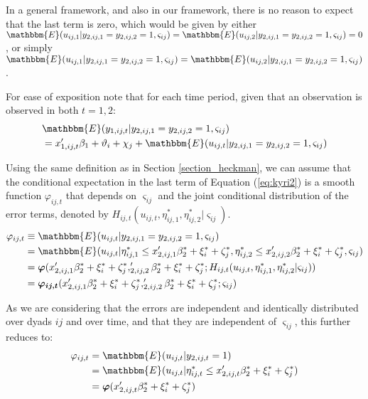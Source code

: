In a general framework, and also in our framework, there is no reason to expect that the last term is zero, which would be given by either $\mathbbm{E} (u_{ij,1} \rvert y_{2,ij,1} = y_{2,ij,2} = 1, \varsigma_{ij}) = \mathbbm{E} (u_{ij,2} \rvert y_{2,ij,1} = y_{2,ij,2} = 1, \varsigma_{ij}) = 0$, or simply  $\mathbbm{E} (u_{ij,1} \rvert y_{2,ij,1} = y_{2,ij,2} = 1, \varsigma_{ij}) = \mathbbm{E} (u_{ij,2} \rvert y_{2,ij,1} = y_{2,ij,2} = 1, \varsigma_{ij})$.

For ease of exposition note that for each time period, given that an observation is observed in both $t=1,2$:
\begin{align} \label{eq:kyri2}
    &\mathbbm{E}(y_{1,ij,t} \rvert y_{2,ij,1} = y_{2,ij,2} = 1, \varsigma_{ij}) \\
    &= x_{1,ij,t}'\beta_1 + \vartheta_i + \chi_j + \mathbbm{E} (u_{ij,t} \rvert y_{2,ij,1} = y_{2,ij,2} = 1, \varsigma_{ij}) \nonumber
\end{align}

Using the same definition as in Section \ref{section_heckman}, we can assume that the conditional expectation in the last term of Equation (\ref{eq:kyri2}) is a smooth function $\varphi_{ij,t}$ that depends on $\varsigma_{ij}$ and the joint conditional distribution of the error terms, denoted by $H_{ij,t}(u_{ij,t}, \eta_{ij,1}^*, \eta_{ij,2}^* \rvert \varsigma_{ij})$. 
\begin{align} \label{eq:kyri3}
    \varphi_{ij,t} &\equiv  \mathbbm{E} (u_{ij,t} \rvert y_{2,ij,1} = y_{2,ij,2} = 1, \varsigma_{ij}) \\
    & = \mathbbm{E} (u_{ij,t} \rvert \eta^*_{i j,1} \leq x_{2,ij,1}'{\beta_2^*}  +\xi_{i}^*+\zeta_{j}^*, \eta^*_{i j,2} \leq x_{2,ij,2}'{\beta_2^*}  +\xi_{i}^*+\zeta_{j}^*,\varsigma_{ij}) \nonumber\\
    &= \bm{\varphi} (x_{2,ij,1}'{\beta_2^*}  +\xi_{i}^*+\zeta_{j}^*, _{2,ij,2}'{\beta_2^*}  +\xi_{i}^*+\zeta_{j}^* ; H_{ij,t}(u_{ij,t}, \eta_{ij,1}^*, \eta_{ij,2}^* \rvert \varsigma_{ij})) \nonumber\\
    &= \bm{\varphi_{ij,t}} (x_{2,ij,1}'{\beta_2^*}  +\xi_{i}^*+\zeta_{j}^*, _{2,ij,2}'{\beta_2^*}  +\xi_{i}^*+\zeta_{j}^* ;\varsigma_{ij}) \nonumber
\end{align}

As we are considering that the errors are independent and identically distributed over dyads $ij$ and over time, and that they are independent of $\varsigma_{ij}$, this further reduces to:
\begin{align} \label{eq:kyri4}
    \varphi_{ij,t} &= \mathbbm{E} (u_{ij,t} \rvert y_{2,ij,t} = 1) \\
    &= \mathbbm{E} (u_{ij,t} \rvert \eta^*_{i j,t} \leq x_{2,ij,t}'{\beta_2^*}  +\xi_{i}^*+\zeta_{j}^*) \nonumber \\
    &= \bm{\varphi}(x_{2,ij,t}'{\beta_2^*}  +\xi_{i}^*+\zeta_{j}^*) \nonumber 
\end{align}

